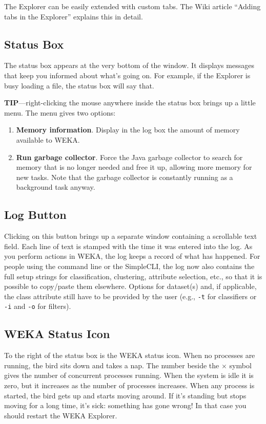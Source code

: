 The Explorer can be easily extended with custom tabs. The Wiki 
article ``Adding tabs in the Explorer'' \cite{explorertabs} explains
this in detail.


\subsection{Status Box}

The status box appears at the very bottom of the window. It displays
messages that keep you informed about what's going on. For example, if
the Explorer is busy loading a file, the status box will say that.

\textbf{TIP}---right-clicking the mouse anywhere inside the status box brings
up a little menu. The menu gives two options: 

\begin{enumerate}
\item \textbf{Memory information}.
Display in the log box the amount of memory available to WEKA.
\item \textbf{Run garbage collector}.
Force the Java garbage collector to search for memory that is no longer needed
and free it up, allowing more memory for new tasks. Note that the garbage
collector is constantly running as a background task anyway.
\end{enumerate}

\subsection{Log Button}

Clicking on this button brings up a separate window containing a scrollable text
field. Each line of text is stamped with the time it was entered into the
log. As you perform actions in WEKA, the log keeps a record of what has
happened. For people using the command line or the SimpleCLI, the log now also 
contains the full setup strings for classification, clustering, attribute selection, 
etc., so that it is possible to copy/paste them elsewhere. 
Options for dataset(s) and, if applicable, the class attribute still have to 
be provided by the user (e.g., \texttt{-t} for classifiers or \texttt{-i} 
and \texttt{-o} for filters).

\subsection{WEKA Status Icon}

To the right of the status box is the WEKA status icon. When no processes are
running, the bird sits down and takes a nap. The number beside the $\times$
symbol gives the number of concurrent processes running.  When the system is
idle it is zero, but it increases as the number of processes increases.
When any process is started, the bird gets up and starts moving around. If
it's standing but stops moving for a long time, it's sick: something has gone
wrong!  In that case you should restart the WEKA Explorer.

